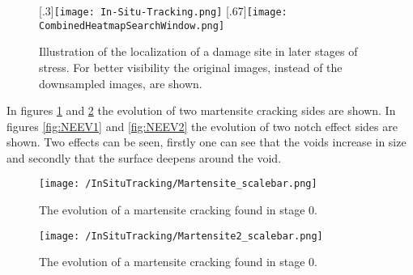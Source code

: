 \begin{figure}
\centering
\subcaptionbox{\label{sub:MovingWindow}}%
  [.3\linewidth]{\texttt{[image: In-Situ-Tracking.png]}}
\centering
\subcaptionbox{\label{sub:VarianceHeatmap}}
  [.67\linewidth]{\texttt{[image: CombinedHeatmapSearchWindow.png]}}
\caption{Illustration of the localization of a damage site in later stages of stress. For better visibility the original images, instead of the downsampled images, are shown.}
\end{figure}


In figures \ref{fig:MCEV1} and \ref{fig:MCEV2} the evolution of two martensite cracking sides are shown. In figures \ref{fig:NEEV1} and \ref{fig:NEEV2} the evolution of two notch effect sides are shown. Two effects can be seen, firstly one can see that the voids increase in size and secondly that the surface deepens around the void. \\

\begin{figure}
\texttt{[image: /InSituTracking/Martensite\_scalebar.png]}
\caption{The evolution of a martensite cracking found in stage 0.}
\label{fig:MCEV1}
\end{figure}

\begin{figure}
\texttt{[image: /InSituTracking/Martensite2\_scalebar.png]}
\caption{The evolution of a martensite cracking found in stage 0.}
\label{fig:MCEV2}
\end{figure}


